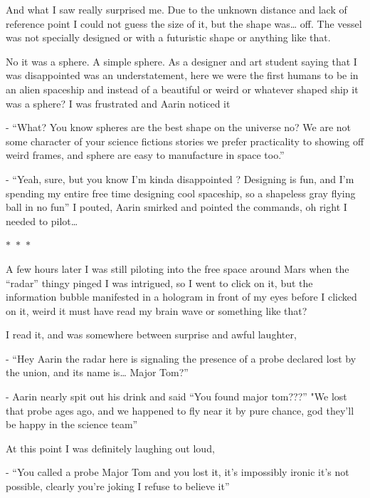 \documentclass[hidelinks,12pt,a4paper]{book}
\newcommand\sep{\begin{center}
  \boldmath $\ast$~$\ast$~$\ast$
\end{center}}
\begin{document}
And what I saw really surprised me. Due to the unknown distance and lack of reference point I could not 
guess the size of it, but the shape was… off. The vessel was not specially designed or with a futuristic 
shape or anything like that.\par
\bigskip

No it was a sphere. A simple sphere. As a designer and art student saying that I was disappointed was an understatement, 
here we were the first humans to be in an alien spaceship and instead of a beautiful or weird or whatever shaped 
ship it was a sphere? I was frustrated and Aarin noticed it\par
\bigskip

- “What? You know spheres are the best shape on the universe no? We are not some character of your 
science fictions stories we prefer practicality to showing off weird frames, 
and sphere are easy to manufacture in space too.”\par
\bigskip

- “Yeah, sure, but you know I'm kinda disappointed ? Designing is fun, and I'm 
spending my entire free time designing cool spaceship, so a shapeless gray flying ball in no fun” I pouted, 
Aarin smirked and pointed the commands, oh right I needed to pilot…

\sep

A few hours later I was still piloting into the free space around Mars when the “radar” thingy pinged I was intrigued,
so I went to click on it, but the information bubble manifested in a hologram in front of my eyes before I clicked on it, 
weird it must have read my brain wave or something like that? \par
\bigskip

I read it, and was somewhere between surprise and awful laughter,\par
\bigskip

- “Hey Aarin the radar here is signaling the presence of a probe declared lost by the union, and its name is… Major Tom?”\par
\bigskip

- Aarin nearly spit out his drink and said “You found major tom???” "We lost that probe ages ago, 
and we happened to fly near it by pure chance, god they'll be happy in the science team”\par
\bigskip

At this point I was definitely laughing out loud,\par
\bigskip

- “You called a probe Major Tom and you lost it, it's impossibly ironic it's not possible, 
clearly you're joking I refuse to believe it”\par
\bigskip
\end{document}
